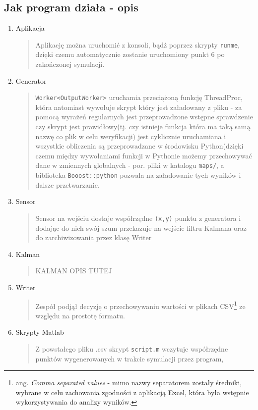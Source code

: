 \documentclass{article}
\begin{document}
	\subsection{Jak program działa - opis}
	\begin{enumerate}
		\item Aplikacja
		\begin{verse} 
			Aplikację można uruchomić z konsoli, bądź poprzez skrypty \texttt{runme}, dzięki czemu automatycznie zostanie uruchomiony punkt 6 po zakończonej symulacji.
		\end{verse}
		\item Generator
		 \begin{verse}
		 \texttt{Worker<OutputWorker>} uruchamia przeciążoną funkcję ThreadProc, która natomiast wywołuje skrypt który jest załadowany z pliku - za pomocą wyrażeń regularnych jest przeprowadzone wstępne sprawdzenie czy skrypt jest prawidłowy(tj. czy istnieje funkcja która ma taką samą nazwę co plik w celu weryfikacji) jest cyklicznie uruchamiana i wszystkie obliczenia są przeprowadzane w środowisku Python(dzięki czemu między wywołaniami funkcji w Pythonie możemy przechowywać dane w zmiennych globalnych - por. pliki w katalogu \texttt{maps/}, a biblioteka \texttt{Booost::python} pozwala na załadowanie tych wyników i dalsze przetwarzanie.
		 \end{verse}
		\item Sensor
		\begin{verse}
		Sensor na wejściu dostaje współrzędne \texttt{(x,y)} punktu z generatora i dodając do nich swój szum przekazuje na wejście filtru Kalmana oraz do zarchiwizowania przez klasę Writer
		\end{verse}
		\item Kalman
		\begin{verse}
		KALMAN OPIS TUTEJ
		\end{verse}
		\item Writer
		\begin{verse}
		Zespół podjął decyzję o przechowywaniu wartości w plikach CSV\footnote{ang. \textit{Comma separated values} - mimo nazwy separatorem zostały średniki, wybrane w celu zachowania zgodności z aplikacją Excel, która była wstępnie wykorzystywania do analizy wyników.} ze względu na prostotę formatu. 
		\end{verse}
		\item Skrypty Matlab 
		\begin{verse}
		Z powstałego pliku .csv skrypt \texttt{script.m} wczytuje współrzędne
		punktów wygenerowanych w trakcie symulacji przez program,

\end{verse}
\end{enumerate}
\end{document}
